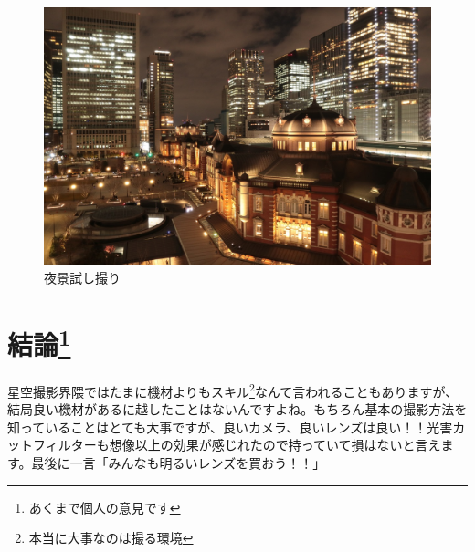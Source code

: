 \documentclass[a4paper.10pt]{jarticle}
\begin{document}
\begin{figure}[H]
	\begin{center}
		\includegraphics[width=14cm]{tokyo.jpg}
		\caption{夜景試し撮り}
		\label{}
	\end{center}
\end{figure}
\section{結論\footnote{あくまで個人の意見です}}
星空撮影界隈ではたまに機材よりもスキル\footnote{本当に大事なのは撮る環境}なんて言われることもありますが、結局良い機材があるに越したことはないんですよね。もちろん基本の撮影方法を知っていることはとても大事ですが、良いカメラ、良いレンズは良い！！光害カットフィルターも想像以上の効果が感じれたので持っていて損はないと言えます。最後に一言「みんなも明るいレンズを買おう！！」
\end{document}
